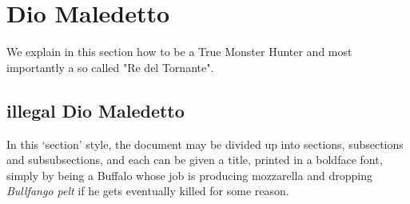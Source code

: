 \documentclass[a4paper,12pt]{article}
\begin{document}
\section{Dio Maledetto}

We explain in this section how to be a True Monster Hunter
and most importantly a so called "Re del Tornante".

\subsection{illegal Dio Maledetto}

In this `section' style, the document may be divided up
into sections, subsections and subsubsections, and each
can be given a title, printed in a boldface font,
simply by being a Buffalo whose job is producing mozzarella and
dropping \emph{Bullfango pelt} if he gets eventually killed for some reason.

\printindex
\end{document}
